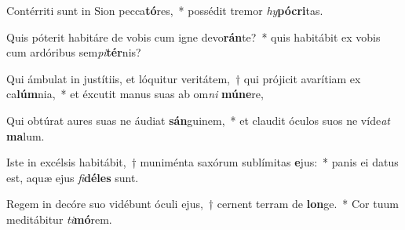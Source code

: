 \item Contérriti sunt in Sion pecca\textbf{tó}res,~* possédit tremor \textit{hy}\textbf{pó}\textbf{cri}tas.
\item Quis póterit habitáre de vobis cum igne devo\textbf{rán}te?~* quis habitábit ex vobis cum ardóribus sem\textit{pi}\textbf{tér}nis?
\item Qui ámbulat in justítiis, et lóquitur veritátem,~† qui prójicit avarítiam ex ca\textbf{lúm}nia,~* et éxcutit manus suas ab om\textit{ni} \textbf{mú}\textbf{ne}re,
\item Qui obtúrat aures suas ne áudiat \textbf{sán}guinem,~* et claudit óculos suos ne víde\textit{at} \textbf{ma}lum.
\item Iste in excélsis habitábit,~† muniménta saxórum sublímitas \textbf{e}jus:~* panis ei datus est, aquæ ejus \textit{fi}\textbf{dé}\textbf{les} sunt.
\item Regem in decóre suo vidébunt óculi ejus,~† cernent terram de \textbf{lon}ge.~* Cor tuum meditábitur \textit{ti}\textbf{mó}rem.
